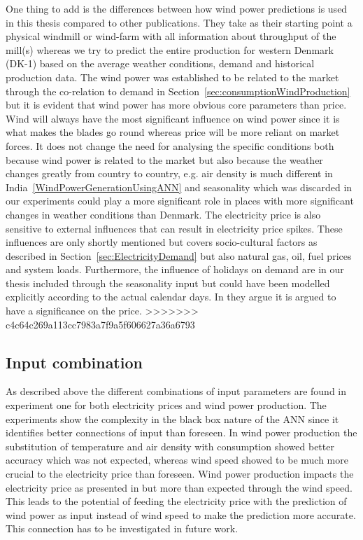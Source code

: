 One thing to add is the differences between how wind power predictions is used in this thesis compared to other publications. They take as their starting point a physical windmill or wind-farm with all information about throughput of the mill(s)\cite{windForecastPortugal,ShortTermWindPowerForecasting,dayAheadImpactOfWindPowerForecasts,WindPowerGenerationUsingANN} whereas we try to predict the entire production for western Denmark (DK-1) based on the average weather conditions, demand and historical production data. The wind power was established to be related to the market through the co-relation to demand in Section~\ref{sec:consumptionWindProduction} but it is evident that wind power has more obvious core parameters than price. Wind will always have the most significant influence on wind power since it is what makes the blades go round whereas price will be more reliant on market forces. It does not change the need for analysing the specific conditions both because wind power is related to the market but also because the weather changes greatly from country to country, e.g. air density is much different in India~\ref{WindPowerGenerationUsingANN} and seasonality which was discarded in our experiments could play a more significant role in places with more significant changes in weather conditions than Denmark. The electricity price is also sensitive to external influences that can result in electricity price spikes\cite{singhal2011electricity}. These influences are only shortly mentioned but covers socio-cultural factors as described in Section~\ref{sec:ElectricityDemand} but also natural gas, oil, fuel prices and system loads\cite{singhal2011electricity}. Furthermore, the influence of holidays on demand are in our thesis included through the seasonality input but could have been modelled explicitly according to the actual calendar days. In \cite{EnergyPriceForecasting,chen2004load} they argue it is argued to have a significance on the price.
>>>>>>> c4c64c269a113cc7983a7f9a5f606627a36a6793

\subsection{Input combination}
As described above the different combinations of input parameters are found in experiment one for both electricity prices and wind power production. The experiments show the complexity in the black box nature of the ANN since it identifies better connections of input than foreseen. In wind power production the substitution of temperature and air density with consumption showed better accuracy which was not expected, whereas wind speed showed to be much more crucial to the electricity price than foreseen. Wind power production impacts the electricity price as presented in \cite{dayAheadImpactOfWindPowerForecasts} but more than expected through the wind speed. This leads to the potential of feeding the electricity price with the prediction of wind power as input instead of wind speed to make the prediction more accurate. This connection has to be investigated in future work.

